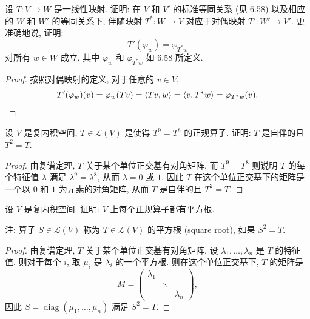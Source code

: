 \documentclass{article}
\begin{document}
\begin{problem}[7A-32]
设 $T: V \to W$ 是一线性映射. 证明: 在 $V$ 和 $V'$ 的标准等同关系 (见 6.58) 以及相应的 $W$ 和 $W'$ 的等同关系下, 伴随映射 $T^*: W \to V$ 对应于对偶映射 $T': W' \to V'$. 更准确地说, 证明:
\[T'(\varphi_w) = \varphi_{T^* w}\]
对所有 $w \in W$ 成立, 其中 $\varphi_w$ 和 $\varphi_{T^* w}$ 如 6.58 所定义.
\end{problem}

\begin{proof}
  按照对偶映射的定义, 对于任意的 \( v\in V \), 
  \[ T'(\varphi_w)(v) = \varphi_w(Tv) 
    = \left\langle Tv, w \right\rangle 
    = \left\langle v, T^*w \right\rangle 
    = \varphi_{T^*w}(v). \]
\end{proof}



\begin{problem}[7B-6]
设 $V$ 是复内积空间, $T \in \mathcal{L}(V)$ 是使得 $T^9 = T^8$ 的正规算子. 证明: $T$ 是自伴的且 $T^2 = T$.
\end{problem}

\begin{proof}
  由复谱定理, \( T \) 关于某个单位正交基有对角矩阵. 而 \( T^9=T^8 \) 则说明 \( T \) 的每个特征值 \( \lambda \) 满足 \( \lambda^9=\lambda^8 \), 从而 \( \lambda=0 \) 或 \( 1 \). 因此 \( T \) 在这个单位正交基下的矩阵是一个以 \( 0 \) 和 \( 1 \) 为元素的对角矩阵, 从而 \( T \) 是自伴的且 \( T^2=T \).
\end{proof}



\begin{problem}[7B-10]
设 $V$ 是复内积空间. 证明: $V$ 上每个正规算子都有平方根.
\par
注: 算子 $S \in \mathcal{L}(V)$ 称为 $T \in \mathcal{L}(V)$ 的平方根 (square root), 如果 $S^2 = T$.
\end{problem}

\begin{proof}
  由复谱定理, \( T \) 关于某个单位正交基有对角矩阵. 设 \( \lambda_1, \ldots, \lambda_n \) 是 \( T \) 的特征值. 则对于每个 \( i \), 取 \( \mu_i \) 是 \( \lambda_i \) 的一个平方根. 则在这个单位正交基下, \( T \) 的矩阵是
  \[ M=\begin{pmatrix}
    \lambda_1 & &\\
    &\ddots&\\
    & &\lambda_n
  \end{pmatrix}, \]
  因此 \( S=\operatorname{diag}(\mu_1, \ldots, \mu_n) \) 满足 \( S^2=T \).
\end{proof}
\end{document}
